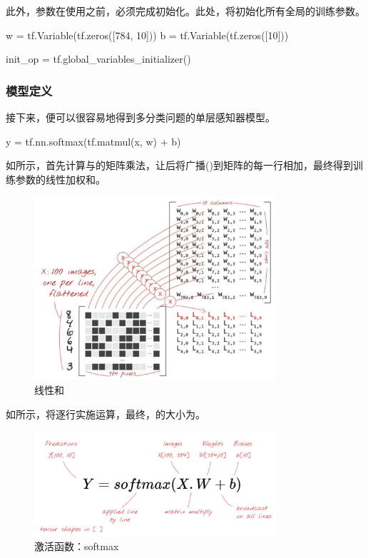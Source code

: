 \begin{content}
此外，参数在使用之前，必须完成初始化。此处，将初始化所有全局的训练参数。

\begin{leftbar}
\begin{python}
w = tf.Variable(tf.zeros([784, 10]))
b = tf.Variable(tf.zeros([10]))

init_op = tf.global_variables_initializer()
\end{python}
\end{leftbar}

\subsubsection{模型定义}

接下来，便可以很容易地得到多分类问题的单层感知器模型。

\begin{leftbar}
\begin{python}
y = tf.nn.softmax(tf.matmul(x, w) + b)
\end{python}
\end{leftbar}

如所示，首先计算与的矩阵乘法，让后将广播()到矩阵的每一行相加，最终得到训练参数的线性加权和。

\begin{figure}[H]
\centering
\includegraphics[width=0.8\textwidth]{figures/mnist-linear-sum.png}
\caption{线性和}
 \label{fig:mnist-linear-sum}
\end{figure}

如所示，将逐行实施运算，最终，的大小为\code{[100, 10]}。

\begin{figure}[H]
\centering
\includegraphics[width=0.8\textwidth]{figures/mnist-softmax.png}
\caption{激活函数：softmax}
 \label{fig:mnist-softmax}
\end{figure}


\end{content}
